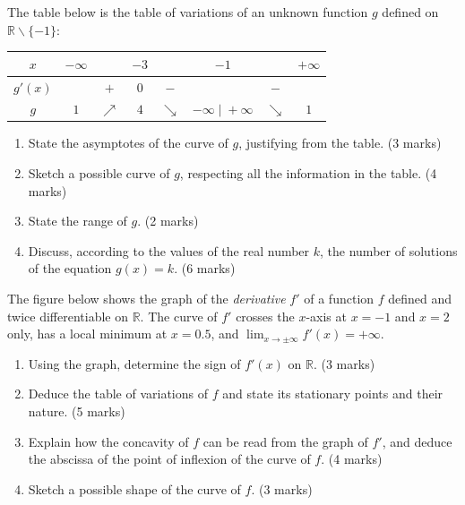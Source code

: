 \documentclass[11pt]{article}
\def\setminus{\mathbin{\backslash}}\let\smallsetminus\setminus
\begin{document}
\begin{exercice}
The table below is the table of variations of an unknown function $g$ defined on $\mathbb{R}\setminus\{-1\}$:
\begin{center}
\begin{tabular}{|c|ccccccc|}
\hline
$x$ & $-\infty$ & & $-3$ & & $-1$ & & $+\infty$ \\
\hline
$g'(x)$ & & $+$ & $0$ & $-$ & & $-$ & \\
\hline
$g$ & $1$ & $\nearrow$ & $4$ & $\searrow$ & $-\infty \;\big|\; +\infty$ & $\searrow$ & $1$ \\
\hline
\end{tabular}
\end{center}
\begin{enumerate}
\item State the asymptotes of the curve of $g$, justifying from the table. \hfill (3 marks)
\item Sketch a possible curve of $g$, respecting all the information in the table. \hfill (4 marks)
\item State the range of $g$. \hfill (2 marks)
\item Discuss, according to the values of the real number $k$, the number of solutions of the equation $g(x)=k$. \hfill (6 marks)
\end{enumerate}
\end{exercice}

\begin{exercice}
The figure below shows the graph of the \emph{derivative} $f'$ of a function $f$ defined and twice differentiable on $\mathbb{R}$. The curve of $f'$ crosses the $x$-axis at $x=-1$ and $x=2$ only, has a local minimum at $x=0.5$, and $\lim_{x\to\pm\infty}f'(x)=+\infty$.
\begin{center}
\end{center}
\begin{enumerate}
\item Using the graph, determine the sign of $f'(x)$ on $\mathbb{R}$. \hfill (3 marks)
\item Deduce the table of variations of $f$ and state its stationary points and their nature. \hfill (5 marks)
\item Explain how the concavity of $f$ can be read from the graph of $f'$, and deduce the abscissa of the point of inflexion of the curve of $f$. \hfill (4 marks)
\item Sketch a possible shape of the curve of $f$. \hfill (3 marks)
\end{enumerate}
\end{exercice}
\end{document}
